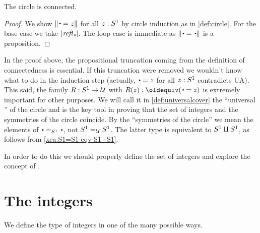 \begin{lemma}\label{lem:circleisconnected}
  The circle is connected.
\end{lemma}
\begin{proof}
We show $\Trunc{\base=z}$ for all $z:{S^1}$ by circle induction
as in \cref{def:circle}.
For the base case we take $\trunc{\refl{\base}}$.
The loop case is immediate as $\Trunc{\base=\base}$ is a proposition.
\end{proof}

In the proof above, the propositional truncation coming 
from the definition of connectedness is essential.
If this truncation were removed we wouldn't know what to do in
the induction step (actually, ${\base=z}$ for all $z:{S^1}$ contradicts UA).
This said, the family $R:{S^1}\to\mathcal{U}$ with $R(z)\defequi (\base=z)$ is extremely 
important for other purposes. We will call it in \cref{def:universalcover} the 
``universal \covering'' of the circle and is the key tool in proving that 
the set of integers and the symmetries of the circle coincide.
By the ``symmetries of the circle'' we mean the elements of $\base=_{\Sc}\base$,
not ${S^1}=_{\mathcal{U}}{S^1}$. The latter type is equivalent to ${S^1}\amalg{S^1}$,
as follows from \cref{xca:S1=S1-eqv-S1+S1}.



In order to do this we should properly define the set of integers 
and explore the concept of \coverings.

\section{The integers}
\label{sec:integers}

We define the type of integers in one of the many possible ways.

